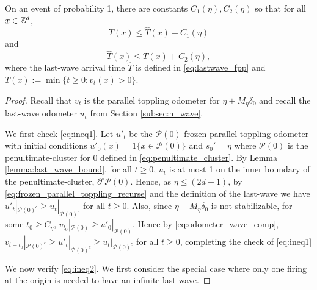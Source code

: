 \documentclass[12pt]{amsart}
\begin{document}
\begin{prop} \label{prop:approximate_subadditive}
	On an event of probability 1, there are constants $C_1(\eta), C_2(\eta)$
	so that for all $x \in \mathbb{Z}^d$, 
	\begin{equation} \label{eq:ineq1}
	T(x) \leq \hat{T}(x) + C_1(\eta)
	\end{equation}
	and
	\begin{equation} \label{eq:ineq2}
	\hat{T}(x) \leq T(x) + C_2(\eta),
	\end{equation}
	where the last-wave arrival time $\hat{T}$ is defined in \eqref{eq:lastwave_fpp}  
	and $T(x) := \min \{ t \geq 0 : v_t(x) > 0 \}$. 
\end{prop}
\begin{proof}
	
	Recall that $v_t$ is the parallel toppling odometer for $\eta + M_{\eta}  \delta_0$ and recall the last-wave odometer $u_t$ from Section \ref{subsec:n_wave}.
	
	We first check \eqref{eq:ineq1}. 
	Let $u'_t$ be the $\mathcal{P}(0)$-frozen parallel toppling odometer with initial conditions $u'_0(x) = 1\{x \in \mathcal{P}(0)\}$ and
	$s_0' = \eta$ 
	where $\mathcal{P}(0)$ is the penultimate-cluster for $0$ defined in \eqref{eq:penultimate_cluster}.
	By Lemma \ref{lemma:last_wave_bound}, for all $t \geq 0$, $u_{t}$ is at most 1 on the inner boundary of the penultimate-cluster, $\partial^{\circ} \mathcal{P}(0)$.  
	Hence, as $\eta \leq (2 d -1)$, 
	by \eqref{eq:frozen_parallel_toppling_recurse} and the definition of the last-wave we have $u'_t |_{\mathcal{P}(0)^c} \geq u_t |_{\mathcal{P}(0)^c}$ for all $t \geq 0$. Also, since $\eta + M_{\eta}  \delta_0$ is not stabilizable, for some $t_0 \geq C_{\eta}$, $v_{t_0} |_{\mathcal{P}(0)} \geq u'_{0} |_{\mathcal{P}(0)}$. 
	Hence by \eqref{eq:odometer_wave_comp}, $v_{t + t_0} |_{\mathcal{P}(0)^c} \geq u'_t |_{\mathcal{P}(0)^c} \geq u_t |_{\mathcal{P}(0)^c}$ for all $t \geq 0$, 
	completing the check of \eqref{eq:ineq1}
	
	
	We now verify \eqref{eq:ineq2}. We first consider the special case where only
	one firing at the origin is needed to have an infinite last-wave. 
	

\end{proof}
\end{document}
